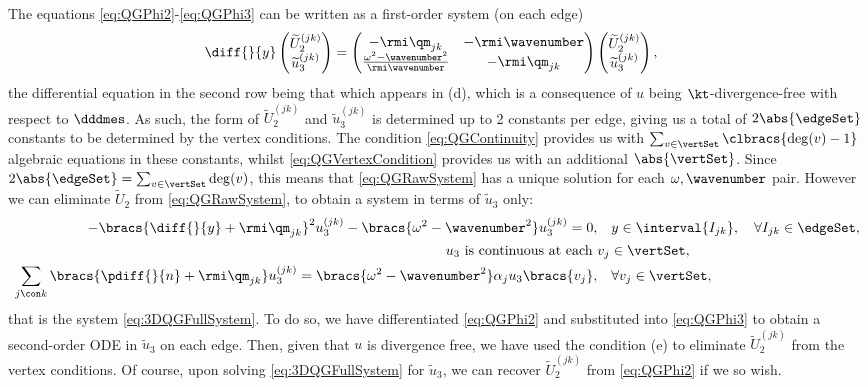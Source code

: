 The equations \eqref{eq:QGPhi2}-\eqref{eq:QGPhi3} can be written as a first-order system (on each edge)
\begin{align*}
	\diff{}{y} \begin{pmatrix} \widetilde{U}_2^{(jk)} \\ \widetilde{u}_3^{(jk)} \end{pmatrix}
	&= 
	\begin{pmatrix} 
		-\rmi\qm_{jk} & -\rmi\wavenumber \\	
		\frac{\omega^2-\wavenumber^2}{\rmi\wavenumber} & -\rmi\qm_{jk}
	\end{pmatrix}
	\begin{pmatrix} \widetilde{U}_2^{(jk)} \\ \widetilde{u}_3^{(jk)} \end{pmatrix},
\end{align*}
the differential equation in the second row being that which appears in (d), which is a consequence of $u$ being $\kt$-divergence-free with respect to $\dddmes$.
As such, the form of $\widetilde{U}_2^{(jk)}$ and $\widetilde{u}_3^{(jk)}$ is determined up to 2 constants per edge, giving us a total of $2\abs{\edgeSet}$ constants to be determined by the vertex conditions.
The condition \eqref{eq:QGContinuity} provides us with $\sum_{v\in\vertSet}\clbracs{\mathrm{deg}(v)-1}$ algebraic equations in these constants, whilst \eqref{eq:QGVertexCondition} provides us with an additional $\abs{\vertSet}$.
Since $2\abs{\edgeSet} = \sum_{v\in\vertSet}\mathrm{deg}(v)$, this means that \eqref{eq:QGRawSystem} has a unique solution for each $\omega, \wavenumber$ pair.
However we can eliminate $\widetilde{U}_2$ from \eqref{eq:QGRawSystem}, to obtain a system in terms of $\widetilde{u}_3$ only:
\begin{align*}
	- \bracs{ \diff{}{y} + \rmi\qm_{jk} }^2 u_3^{(jk)} - \bracs{\omega^2-\wavenumber^2}u_3^{(jk)} = 0, &\quad y\in\interval{I_{jk}}, \quad\forall I_{jk}\in\edgeSet, \\
	u_3 \text{ is continuous at each } & v_j\in\vertSet, \\
	\sum_{j\con k}\bracs{ \pdiff{}{n} + \rmi\qm_{jk} }u_3^{(jk)} = \bracs{\omega^2-\wavenumber^2}\alpha_j u_3\bracs{v_j}, &\quad\forall v_j\in\vertSet,
\end{align*}
that is the system \eqref{eq:3DQGFullSystem}.
To do so, we have differentiated \eqref{eq:QGPhi2} and substituted into \eqref{eq:QGPhi3} to obtain a second-order ODE in $\widetilde{u}_3$ on each edge.
Then, given that $u$ is divergence free, we have used the condition (e) to eliminate $\widetilde{U}_2^{(jk)}$ from the vertex conditions.
Of course, upon solving \eqref{eq:3DQGFullSystem} for $\widetilde{u}_3$, we can recover $\widetilde{U}_2^{(jk)}$ from \eqref{eq:QGPhi2} if we so wish.

